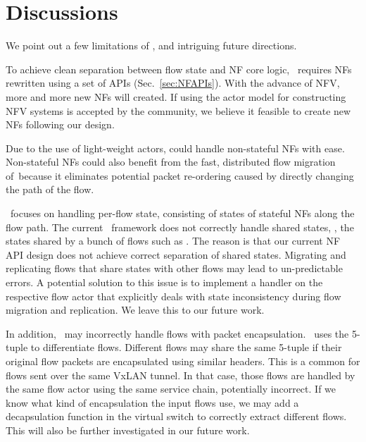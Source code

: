 \section{Discussions}
\label{sec:discussion}

We point out a few limitations of \nfactor, and intriguing future directions.

To achieve clean separation between flow state and NF core logic, \nfactor~requires NFs rewritten using a set of APIs (Sec.~\ref{sec:NFAPIs}). With the advance of NFV, more and more new NFs will created. If using the actor model for constructing NFV systems is accepted by the community, we believe it feasible to create new NFs following our design. %

Due to the use of light-weight actors, \nfactor could handle non-stateful NFs with ease. Non-stateful NFs could also benefit from the fast, distributed flow migration of~\nfactor because it eliminates potential packet re-ordering caused by directly changing the path of the flow.

\nfactor~focuses on handling per-flow state, consisting of states of stateful NFs along the flow path. The current \nfactor~framework does not correctly handle shared states, \ie, the states shared by a bunch of flows such as \cite{bro}.%
The reason is that %
our current NF API design does not achieve correct separation of shared states. Migrating and replicating flows that share states with other flows may lead to un-predictable errors. A potential solution to this issue is to implement a handler on the respective flow actor that explicitly deals with state inconsistency during flow migration and replication. We leave this to our future work.

In addition, \nfactor~may incorrectly handle flows with packet encapsulation. \nfactor~uses the 5-tuple to differentiate flows. Different flows may share the same 5-tuple if their original flow packets are encapsulated using similar headers. This is a common for flows sent over the same VxLAN tunnel. In that case, those flows are handled by the same flow actor using the same service chain, potentially incorrect. If we know what kind of encapsulation the input flows use, we may add a decapsulation function in the virtual switch to correctly extract different flows. This will also be further investigated in our future work.
